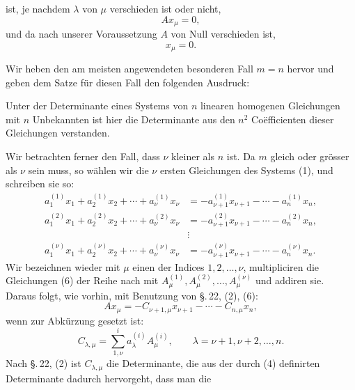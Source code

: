 
ist, je nachdem $\lambda$ von $\mu$ verschieden ist oder nicht,
\[
 A x_\mu=0,
\]
und da nach unserer Voraussetzung $A$ von Null verschieden ist,
\[
 x_\mu=0.
\]

Wir heben den am meisten angewendeten besonderen Fall $m=n$ hervor und geben dem Satze für diesen Fall den folgenden Ausdruck:



Unter der Determinante eines Systems von $n$ linearen homogenen Gleichungen mit $n$ Unbekannten ist hier die Determinante aus den $n^2$ Coëfficienten dieser Gleichungen verstanden.

Wir betrachten ferner den Fall, dass $\nu$ kleiner als $n$ ist. Da $m$ gleich oder grösser als $\nu$ sein muss, so wählen wir die $\nu$ ersten Gleichungen des Systems (1), und schreiben sie so:
\begin{equation}
\begin{aligned}
 a_1^{(1)}x_1+a_2^{(1)}x_2+\cdots+a_\nu^{(1)}x_\nu&=-a_{\nu+1}^{(1)}x_{\nu+1}-\cdots-a_n^{(1)}x_n,\\
 a_1^{(2)}x_1+a_2^{(2)}x_2+\cdots+a_\nu^{(2)}x_\nu&=-a_{\nu+1}^{(2)}x_{\nu+1}-\cdots-a_n^{(2)}x_n,\\
 &\vdots\\
 a_1^{(\nu)}x_1+a_2^{(\nu)}x_2+\cdots+a_\nu^{(\nu)}x_\nu&=-a_{\nu+1}^{(\nu)}x_{\nu+1}-\cdots-a_n^{(\nu)}x_n.
\end{aligned}
\tag{6}
\end{equation}
Wir bezeichnen wieder mit $\mu$ einen der Indices $1,2,\ldots,\nu$, multipliciren die Gleichungen (6) der Reihe nach mit $A_\mu^{(1)},A_\mu^{(2)},\ldots,A_\mu^{(\nu)}$ und addiren sie. Daraus folgt, wie vorhin, mit Benutzung von \S.\,22, (2), (6):
\begin{equation}
 A x_\mu=-C_{\nu+1,\mu}x_{\nu+1}-\cdots-C_{n,\mu}x_n,
\tag{7}
\end{equation}
wenn zur Abkürzung gesetzt ist:
\begin{equation}
 C_{\lambda,\mu}=\sum_{1,\nu}^{i}a_\lambda^{(i)}A_\mu^{(i)},
 \qquad \lambda=\nu+1,\nu+2,\ldots,n.
\tag{8}
\end{equation}
Nach \S.\,22, (2) ist $C_{\lambda,\mu}$ die Determinante, die aus der durch (4) definirten Determinante dadurch hervorgeht, dass man die
